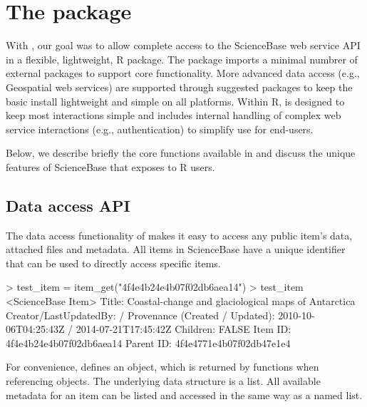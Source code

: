 
\section{The  package}

With , our goal was to allow complete
access to the ScienceBase web service API in a flexible, lightweight, 
R package. The package imports a minimal numbrer of external packages
to support core functionality. More advanced data access (e.g., Geospatial 
web services) are supported through suggested packages to keep the basic 
install lightweight and simple on all platforms. Within R, 
is designed to keep most interactions simple and includes internal 
handling of complex web service interactions (e.g., authentication) to 
simplify use for end-users. 

Below, we describe briefly the core functions available in  
and discuss the unique features of ScienceBase that  
exposes to R users. 


\subsection{Data access API}
The data access functionality of  makes it easy to 
access any public item's data, attached files and metadata. All items
in ScienceBase have a unique identifier that can be used to directly 
access specific items. 

\begin{example}
> test_item = item_get("4f4e4b24e4b07f02db6aea14")
> test_item
<ScienceBase Item> 
  Title: Coastal-change and glaciological maps of Antarctica
  Creator/LastUpdatedBy:      / 
  Provenance (Created / Updated):  2010-10-06T04:25:43Z / 2014-07-21T17:45:42Z
  Children: FALSE
  Item ID: 4f4e4b24e4b07f02db6aea14
  Parent ID: 4f4e4771e4b07f02db47e1e4
\end{example}

For convenience,  defines an  object, which is 
returned by  functions when referencing objects. The underlying
data structure is a list. All available metadata for an item can be listed
and accessed in the same way as a named list.


